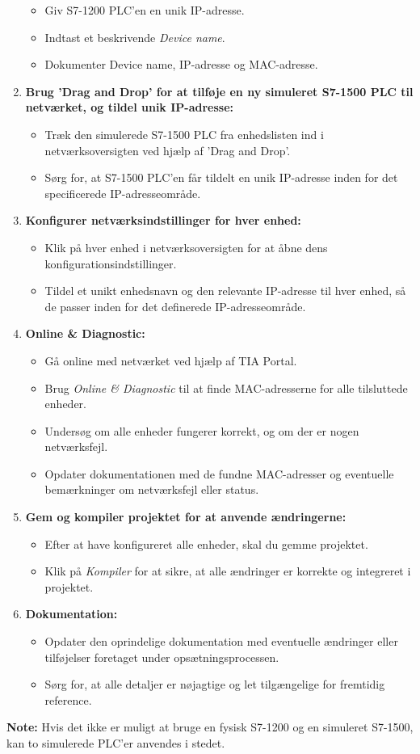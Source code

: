 \begin{enumerate}
\begin{itemize}
		\item Giv S7-1200 PLC'en en unik IP-adresse.
		\item Indtast et beskrivende \textit{Device name}.
		\item Dokumenter Device name, IP-adresse og MAC-adresse.
	\end{itemize}
	\item \textbf{Brug 'Drag and Drop' for at tilføje en ny simuleret S7-1500 PLC til netværket, og tildel unik IP-adresse:}
	\begin{itemize}
		\item Træk den simulerede S7-1500 PLC fra enhedslisten ind i netværksoversigten ved hjælp af 'Drag and Drop'.
		\item Sørg for, at S7-1500 PLC'en får tildelt en unik IP-adresse inden for det specificerede IP-adresseområde.
	\end{itemize}
	\item \textbf{Konfigurer netværksindstillinger for hver enhed:}
	\begin{itemize}
		\item Klik på hver enhed i netværksoversigten for at åbne dens konfigurationsindstillinger.
		\item Tildel et unikt enhedsnavn og den relevante IP-adresse til hver enhed, så de passer inden for det definerede IP-adresseområde.
	\end{itemize}
	\item \textbf{Online \& Diagnostic:}
	\begin{itemize}
		\item Gå online med netværket ved hjælp af TIA Portal.
		\item Brug \textit{Online \& Diagnostic} til at finde MAC-adresserne for alle tilsluttede enheder.
		\item Undersøg om alle enheder fungerer korrekt, og om der er nogen netværksfejl.
		\item Opdater dokumentationen med de fundne MAC-adresser og eventuelle bemærkninger om netværksfejl eller status.
	\end{itemize}
	\item \textbf{Gem og kompiler projektet for at anvende ændringerne:}
	\begin{itemize}
		\item Efter at have konfigureret alle enheder, skal du gemme projektet.
		\item Klik på \textit{Kompiler} for at sikre, at alle ændringer er korrekte og integreret i projektet.
	\end{itemize}
	\item \textbf{Dokumentation:}
	\begin{itemize}
		\item Opdater den oprindelige dokumentation med eventuelle ændringer eller tilføjelser foretaget under opsætningsprocessen.
		\item Sørg for, at alle detaljer er nøjagtige og let tilgængelige for fremtidig reference.
	\end{itemize}
\end{enumerate}
\noindent\textbf{Note:} Hvis det ikke er muligt at bruge en fysisk S7-1200 og en simuleret S7-1500, kan to simulerede PLC'er anvendes i stedet.

